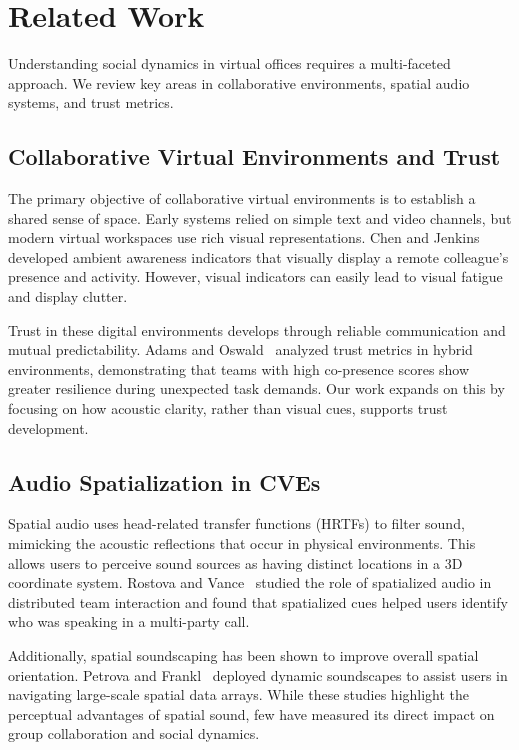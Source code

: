 \section{Related Work}
Understanding social dynamics in virtual offices requires a multi-faceted approach. We review key areas in collaborative environments, spatial audio systems, and trust metrics.

\subsection{Collaborative Virtual Environments and Trust}
The primary objective of collaborative virtual environments is to establish a shared sense of space. Early systems relied on simple text and video channels, but modern virtual workspaces use rich visual representations. Chen and Jenkins~\cite{chen2022nimbus} developed ambient awareness indicators that visually display a remote colleague's presence and activity. However, visual indicators can easily lead to visual fatigue and display clutter. 

Trust in these digital environments develops through reliable communication and mutual predictability. Adams and Oswald~\cite{adams2021virtual} analyzed trust metrics in hybrid environments, demonstrating that teams with high co-presence scores show greater resilience during unexpected task demands. Our work expands on this by focusing on how acoustic clarity, rather than visual cues, supports trust development.

\subsection{Audio Spatialization in CVEs}
Spatial audio uses head-related transfer functions (HRTFs) to filter sound, mimicking the acoustic reflections that occur in physical environments. This allows users to perceive sound sources as having distinct locations in a 3D coordinate system. Rostova and Vance~\cite{rostova2023trust} studied the role of spatialized audio in distributed team interaction and found that spatialized cues helped users identify who was speaking in a multi-party call. 

Additionally, spatial soundscaping has been shown to improve overall spatial orientation. Petrova and Frankl~\cite{apex2021audio} deployed dynamic soundscapes to assist users in navigating large-scale spatial data arrays. While these studies highlight the perceptual advantages of spatial sound, few have measured its direct impact on group collaboration and social dynamics.

